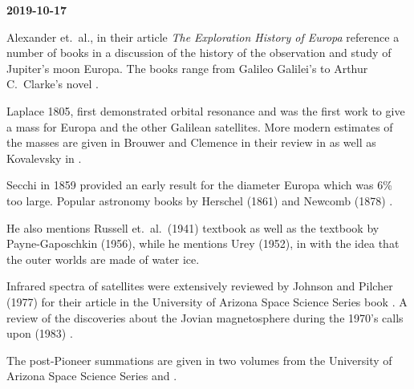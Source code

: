 
{\bf 2019-10-17}

Alexander et.\ al., in their article {\it The Exploration History of
Europa} \cite{Alexander2009} reference a number of books in a
discussion of the history of the observation and study of Jupiter's
moon Europa.  The books range from Galileo Galilei's  \cite{Galilei1989} to Arthur C.\ Clarke's novel  \cite{Clarke1982}.

Laplace 1805,  \cite{Laplace1805} first
demonstrated orbital resonance and was the first work to give a mass
for Europa and the other Galilean satellites. More modern estimates of
the masses are given in Brouwer and Clemence \cite{Brouwer1961} in
their review in  \cite{Kuiper1961} as well
as Kovalevsky \cite{Kovalevsky1970} in  \cite{Dollfus1970}.

Secchi in 1859 \cite{Secchi1859} provided an early result for the
diameter Europa which was 6\% too large.  Popular astronomy books by
Herschel (1861) \cite{Herschel1861} and Newcomb
(1878) \cite{Newcomb1878}.

He also mentions Russell et.\ al.\ (1941) \cite{Russell1941} textbook
 as well as the textbook by Payne-Gaposchkin (1956),
 \cite{Payne-Gaposchkin1956} while he mentions
Urey (1952), in  \cite{Urey1952} with the idea that
the outer worlds are made of water ice.

Infrared spectra of satellites were extensively reviewed by Johnson
and Pilcher (1977) \cite{Johnson1977} for their article in the
University of Arizona Space Science Series book  \cite{Burns1977}. A review of the discoveries about
the Jovian magnetosphere during the 1970's calls upon  (1983) \cite{Dressler1983}.

The post-Pioneer summations are given in two volumes from the
University of Arizona Space Science Series  \cite{Burns1977} and \cite{Gehrels1976}.


 \cite{Morrison1982}

